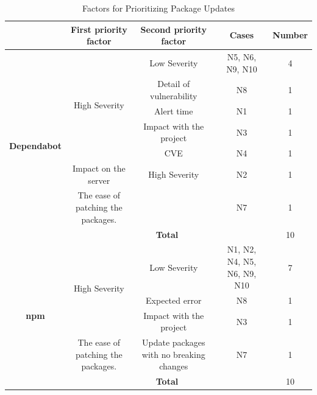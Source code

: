 \documentclass[conference]{IEEEtran}
\begin{document}
	\begin{table}[tb]
		\caption{Factors for Prioritizing Package Updates}
		\begin{tabular}{|c|c|c|c|c|}
			\hline
			\multicolumn{1}{|l|}{}               & \textbf{First priority factor}     & \textbf{Second priority factor}          & \textbf{Cases}              & \textbf{Number} \\ \hline
			\multirow{8}{*}{\textbf{Dependabot}} & \multirow{5}{*}{High Severity}     & Low Severity                             & N5, N6, N9, N10             & 4               \\ \cline{3-5} 
			&                                    & Detail of vulnerability                  & N8                          & 1               \\ \cline{3-5} 
			&                                    & Alert time                               & N1                          & 1               \\ \cline{3-5} 
			&                                    & Impact with the project                  & N3                          & 1               \\ \cline{3-5} 
			&                                    & CVE                                      & N4                          & 1               \\ \cline{2-5} 
			& Impact on the server               & High Severity                            & N2                          & 1               \\ \cline{2-5} 
			& The ease of patching the packages. & \multicolumn{1}{l|}{}                    & N7                          & 1               \\ \cline{2-5} 
			& \multicolumn{3}{c|}{\textbf{Total}}                                                                         & 10               \\ \hline
			\multirow{5}{*}{\textbf{npm}}        & \multirow{3}{*}{High Severity}     & Low Severity                             & N1, N2, N4, N5, N6, N9, N10 & 7               \\ \cline{3-5} 
			&                                    & Expected error                           & N8                          & 1               \\ \cline{3-5} 
			&                                    & Impact with the project                  & N3                          & 1               \\ \cline{2-5} 
			& The ease of patching the packages. & Update packages with no breaking changes & N7                          & 1               \\ \cline{2-5} 
			& \multicolumn{3}{c|}{\textbf{Total}}                                                                         & 10               \\ \hline
		\end{tabular}
		\label{table:audit-pri1}
	\end{table}
	
\end{document}
